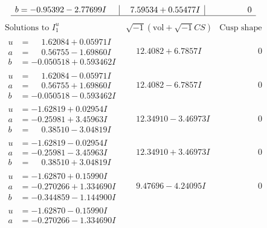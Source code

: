 \documentclass[1p]{elsarticle_modified}
\theoremstyle{definition}
\newcommand{\I}{\sqrt{-1}}
\begin{document}
$$\begin{array}{c|c|c}
\begin{aligned}
b &= -0.95392 - 2.77699 I\end{aligned}
 & \phantom{-}7.59534 + 0.55477 I & \phantom{-0.000000 } 0\\
 \hline 
 \end{array}$$\newpage$$\begin{array}{c|c|c}  
\text{Solutions to }I^u_{1}& \I (\text{vol} + \sqrt{-1}CS) & \text{Cusp shape}\\
 \hline 
\begin{aligned}
u &= \phantom{-}1.62084 + 0.05971 I \\
a &= \phantom{-}0.56755 - 1.69860 I \\
b &= -0.050518 + 0.593462 I\end{aligned}
 & \phantom{-}12.4082 + 6.7857 I & \phantom{-0.000000 } 0 \\ \hline\begin{aligned}
u &= \phantom{-}1.62084 - 0.05971 I \\
a &= \phantom{-}0.56755 + 1.69860 I \\
b &= -0.050518 - 0.593462 I\end{aligned}
 & \phantom{-}12.4082 - 6.7857 I & \phantom{-0.000000 } 0 \\ \hline\begin{aligned}
u &= -1.62819 + 0.02954 I \\
a &= -0.25981 + 3.45963 I \\
b &= \phantom{-}0.38510 - 3.04819 I\end{aligned}
 & \phantom{-}12.34910 - 3.46973 I & \phantom{-0.000000 } 0 \\ \hline\begin{aligned}
u &= -1.62819 - 0.02954 I \\
a &= -0.25981 - 3.45963 I \\
b &= \phantom{-}0.38510 + 3.04819 I\end{aligned}
 & \phantom{-}12.34910 + 3.46973 I & \phantom{-0.000000 } 0 \\ \hline\begin{aligned}
u &= -1.62870 + 0.15990 I \\
a &= -0.270266 + 1.334690 I \\
b &= -0.344859 - 1.144900 I\end{aligned}
 & \phantom{-}9.47696 - 4.24095 I & \phantom{-0.000000 } 0 \\ \hline\begin{aligned}
u &= -1.62870 - 0.15990 I \\
a &= -0.270266 - 1.334690 I \\

\end{aligned}
\end{array}$$
\end{document}
